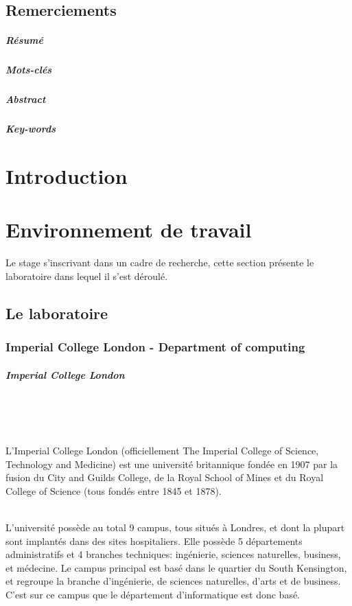 \documentclass[10pt]{report}
\begin{document}
\section*{Remerciements}\newpage
\paragraph*{Résumé} %
\paragraph*{Mots-clés}
\paragraph*{Abstract}
\paragraph*{Key-words}

\renewcommand\contentsname{Sommaire}
\tableofcontents

\newpage

\chapter*{Introduction}

\chapter{Environnement de travail} 

	Le stage s'inscrivant dans un cadre de recherche, cette section présente le laboratoire dans lequel il s'est déroulé.
	\section{Le laboratoire}
	\subsection{Imperial College London - Department of computing}
	\paragraph{Imperial College London}~\par ~\par %
	L’Imperial College London (officiellement The Imperial College of Science, Technology and Medicine) est une université britannique fondée en 1907 par la fusion du City and Guilds College, de la Royal School of Mines et du Royal College of Science (tous fondés entre 1845 et 1878).\\ ~\par
    L'université possède au total 9 campus, tous situés à Londres, et dont la plupart sont implantés dans des sites hospitaliers.  
    Elle possède 5 départements administratifs et 4 branches techniques: ingénierie, sciences naturelles, business, et médecine.	Le campus principal est basé dans le quartier du South Kensington, et regroupe la branche d'ingénierie, de sciences naturelles, d'arts et de business. C'est sur ce campus que le département d'informatique est donc basé. 
    
\end{document}
